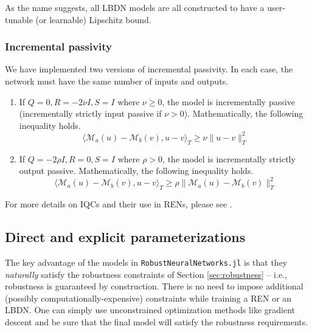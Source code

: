 As the name suggests, all LBDN models are all constructed to have a user-tunable (or learnable) Lipschitz bound.

\subsubsection{Incremental passivity} 
We have implemented two versions of incremental passivity. In each case, the network must have the same number of inputs and outputs.

\begin{enumerate}
    \item If $Q = 0, R = -2\nu I, S = I$ where $\nu \ge 0$, the model is incrementally passive (incrementally strictly input passive if $\nu > 0$). Mathematically, the following inequality holds.
    \begin{equation}
    \langle \mathcal{M}_a(u) - \mathcal{M}_b(v), u-v \rangle_T \ge \nu \| u-v\|^2_T
    \end{equation}
    \item If $Q = -2\rho I, R = 0, S = I$ where $\rho > 0$, the model is incrementally strictly output passive. Mathematically, the following inequality holds.
    \begin{equation}
    \langle \mathcal{M}_a(u) - \mathcal{M}_b(v), u-v \rangle_T \ge \rho \| \mathcal{M}_a(u) - \mathcal{M}_b(v)\|^2_T
    \end{equation}
\end{enumerate}

For more details on IQCs and their use in RENs, please see \cite{Revay++2021b}.

\subsection{Direct and explicit parameterizations} \label{sec:parameterizations}

The key advantage of the models in \verb|RobustNeuralNetworks.jl| is that they \textit{naturally} satisfy the robustness constraints of Section \ref{sec:robustness} -- i.e., robustness is guaranteed by construction. There is no need to impose additional (possibly computationally-expensive) constraints while training a REN or an LBDN. One can simply use unconstrained optimization methods like gradient descent and be sure that the final model will satisfy the robustness requirements.

